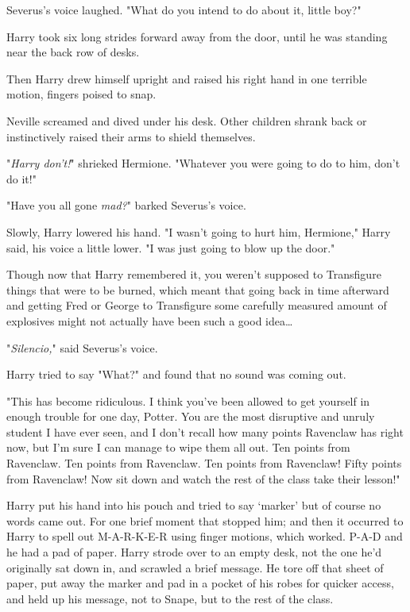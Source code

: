 Severus's voice laughed. "What do you intend to do about it, little boy?"

Harry took six long strides forward away from the door, until he was standing 
near the back row of desks.

Then Harry drew himself upright and raised his right hand in one terrible 
motion, fingers poised to snap.

Neville screamed and dived under his desk. Other children shrank back or 
instinctively raised their arms to shield themselves.

"\emph{Harry don't!}" shrieked Hermione. "Whatever you were going to do to him, 
don't do it!"

"Have you all gone \emph{mad?}" barked Severus's voice.

Slowly, Harry lowered his hand. "I wasn't going to hurt him, Hermione," Harry 
said, his voice a little lower. "I was just going to blow up the door."

Though now that Harry remembered it, you weren't supposed to Transfigure things 
that were to be burned, which meant that going back in time afterward and 
getting Fred or George to Transfigure some carefully measured amount of 
explosives might not actually have been such a good idea{\ldots}

"\emph{Silencio,}" said Severus's voice.

Harry tried to say "What?" and found that no sound was coming out.

"This has become ridiculous. I think you've been allowed to get yourself in 
enough trouble for one day, Potter. You are the most disruptive and unruly 
student I have ever seen, and I don't recall how many points Ravenclaw has 
right now, but I'm sure I can manage to wipe them all out. Ten points from 
Ravenclaw. Ten points from Ravenclaw. Ten points from Ravenclaw! Fifty points 
from Ravenclaw! Now sit down and watch the rest of the class take their lesson!"

Harry put his hand into his pouch and tried to say `marker' but of course no 
words came out. For one brief moment that stopped him; and then it occurred to 
Harry to spell out M-A-R-K-E-R using finger motions, which worked. P-A-D and he 
had a pad of paper. Harry strode over to an empty desk, not the one he'd 
originally sat down in, and scrawled a brief message. He tore off that sheet of 
paper, put away the marker and pad in a pocket of his robes for quicker access, 
and held up his message, not to Snape, but to the rest of the class.

